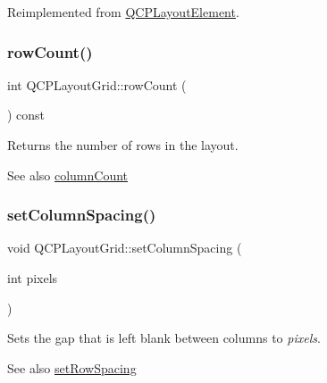Reimplemented from \hyperlink{class_q_c_p_layout_element_ab3fdb5c9a5189bb2dac10d4d25329cd8}{Q\+C\+P\+Layout\+Element}.

\hypertarget{class_q_c_p_layout_grid_a19c66fd76cbce58a8e94f33797e0c0aa}{}\label{class_q_c_p_layout_grid_a19c66fd76cbce58a8e94f33797e0c0aa} 
\subsubsection{\texorpdfstring{row\+Count()}{rowCount()}}
{\footnotesize\ttfamily int Q\+C\+P\+Layout\+Grid\+::row\+Count (\begin{DoxyParamCaption}{ }\end{DoxyParamCaption}) const}

Returns the number of rows in the layout.

\begin{DoxySeeAlso}{See also}
\hyperlink{class_q_c_p_layout_grid_a1a2962cbf45011405b64b913afa8e7a2}{column\+Count} 
\end{DoxySeeAlso}
\hypertarget{class_q_c_p_layout_grid_a3a49272aba32bb0fddc3bb2a45a3dba0}{}\label{class_q_c_p_layout_grid_a3a49272aba32bb0fddc3bb2a45a3dba0} 
\subsubsection{\texorpdfstring{set\+Column\+Spacing()}{setColumnSpacing()}}
{\footnotesize\ttfamily void Q\+C\+P\+Layout\+Grid\+::set\+Column\+Spacing (\begin{DoxyParamCaption}\item[{int}]{pixels }\end{DoxyParamCaption})}

Sets the gap that is left blank between columns to {\itshape pixels}.

\begin{DoxySeeAlso}{See also}
\hyperlink{class_q_c_p_layout_grid_aaef2cd2d456197ee06a208793678e436}{set\+Row\+Spacing} 
\end{DoxySeeAlso}
\hypertarget{class_q_c_p_layout_grid_ae38f31a71687b9d7ee3104852528fb50}{}\label{class_q_c_p_layout_grid_ae38f31a71687b9d7ee3104852528fb50} 
